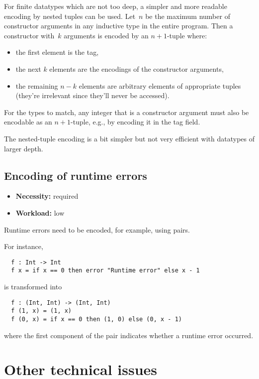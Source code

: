 \documentclass[final]{msc}
\begin{document}
For finite datatypes which are not too deep, a simpler and more
readable encoding by nested tuples can be used. Let~$n$ be the maximum
number of constructor arguments in any inductive type in the entire
program. Then a constructor with~$k$ arguments is encoded by an
$n+1$-tuple where:
\begin{itemize}
\item the first element is the tag,
\item the next $k$ elements are the encodings of the constructor arguments,
\item the remaining $n - k$ elements are arbitrary elements of
  appropriate tuples (they're irrelevant since they'll never be
  accessed).
\end{itemize}
For the types to match, any integer that is a constructor argument must also be encodable as an $n+1$-tuple, e.g., by encoding it in the tag field.

The nested-tuple encoding is a bit simpler but not very efficient with
datatypes of larger depth.

\subsection{Encoding of runtime errors}\label{sec_errors}

\begin{itemize}
\item {\bf Necessity:} required
\item {\bf Workload:} low
\end{itemize}

\noindent Runtime errors need to be encoded, for example, using pairs.

\medskip

\noindent For instance,
\begin{verbatim}
  f : Int -> Int
  f x = if x == 0 then error "Runtime error" else x - 1
\end{verbatim}
is transformed into
\begin{verbatim}
  f : (Int, Int) -> (Int, Int)
  f (1, x) = (1, x)
  f (0, x) = if x == 0 then (1, 0) else (0, x - 1)
\end{verbatim}
where the first component of the pair indicates whether a runtime
error occurred.

\section{Other technical issues}\label{sec_issues}
\end{document}
